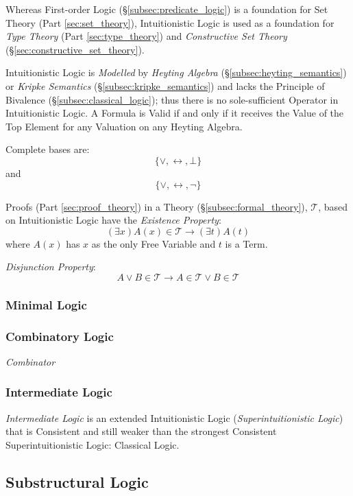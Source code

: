 \documentclass{article}
\begin{document}
Whereas First-order Logic (\S\ref{subsec:predicate_logic}) is a
foundation for Set Theory (Part \ref{sec:set_theory}), Intuitionistic
Logic is used as a foundation for \emph{Type Theory} (Part
\ref{sec:type_theory}) and \emph{Constructive Set Theory}
(\S\ref{sec:constructive_set_theory}).

Intuitionistic Logic is \emph{Modelled} by \emph{Heyting Algebra}
(\S\ref{subsec:heyting_semantics}) or \emph{Kripke Semantics}
(\S\ref{subsec:kripke_semantics}) and lacks the Principle of Bivalence
(\S\ref{subsec:classical_logic}); thus there is no sole-sufficient
Operator in Intuitionistic Logic. A Formula is Valid if and only if it
receives the Value of the Top Element for any Valuation on any Heyting
Algebra.

Complete bases are:
\[
    \{ \vee, \leftrightarrow, \bot \}
\]
and
\[
    \{ \vee, \leftrightarrow, \neg \}
\]

Proofs (Part \ref{sec:proof_theory}) in a Theory
(\S\ref{subsec:formal_theory}), $\mathcal{T}$, based on Intuitionistic
Logic have the \emph{Existence Property}:
\[
    (\exists x)A(x) \in \mathcal{T} \rightarrow (\exists t)A(t)
\]
where $A(x)$ has $x$ as the only Free Variable and $t$ is a Term.

\emph{Disjunction Property}:
\[
    A \vee B \in \mathcal{T} \rightarrow A \in \mathcal{T} \vee B \in \mathcal{T}
\]

\subsubsection{Minimal Logic}

\subsubsection{Combinatory Logic}\label{subsec:combinatory_logic}

\emph{Combinator}

\subsubsection{Intermediate Logic}

\emph{Intermediate Logic} is an extended Intuitionistic Logic
(\emph{Superintuitionistic Logic}) that is Consistent and still weaker
than the strongest Consistent Superintuitionistic Logic: Classical
Logic.

\subsection{Substructural Logic}\label{subsec:substructural_logic}
\end{document}
